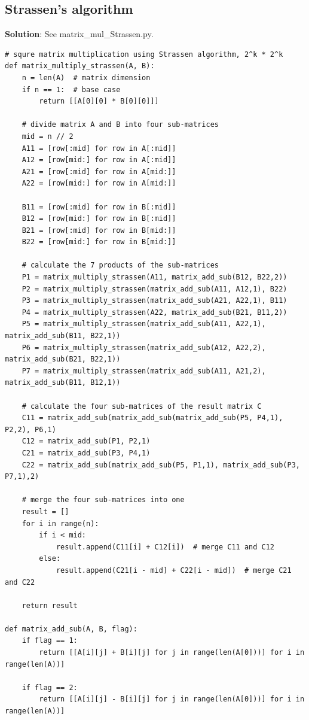 \documentclass[UTF8]{ctexart}
\begin{document}
\subsection{Strassen's algorithm}
\textbf{Solution}: See matrix\_mul\_Strassen.py.
\begin{lstlisting}
# squre matrix multiplication using Strassen algorithm, 2^k * 2^k
def matrix_multiply_strassen(A, B):
    n = len(A)  # matrix dimension
    if n == 1:  # base case
        return [[A[0][0] * B[0][0]]]
    
    # divide matrix A and B into four sub-matrices
    mid = n // 2
    A11 = [row[:mid] for row in A[:mid]]
    A12 = [row[mid:] for row in A[:mid]]
    A21 = [row[:mid] for row in A[mid:]]
    A22 = [row[mid:] for row in A[mid:]]
    
    B11 = [row[:mid] for row in B[:mid]]
    B12 = [row[mid:] for row in B[:mid]]
    B21 = [row[:mid] for row in B[mid:]]
    B22 = [row[mid:] for row in B[mid:]]
    
    # calculate the 7 products of the sub-matrices
    P1 = matrix_multiply_strassen(A11, matrix_add_sub(B12, B22,2))
    P2 = matrix_multiply_strassen(matrix_add_sub(A11, A12,1), B22)
    P3 = matrix_multiply_strassen(matrix_add_sub(A21, A22,1), B11)
    P4 = matrix_multiply_strassen(A22, matrix_add_sub(B21, B11,2))
    P5 = matrix_multiply_strassen(matrix_add_sub(A11, A22,1), matrix_add_sub(B11, B22,1))
    P6 = matrix_multiply_strassen(matrix_add_sub(A12, A22,2), matrix_add_sub(B21, B22,1))
    P7 = matrix_multiply_strassen(matrix_add_sub(A11, A21,2), matrix_add_sub(B11, B12,1))
    
    # calculate the four sub-matrices of the result matrix C
    C11 = matrix_add_sub(matrix_add_sub(matrix_add_sub(P5, P4,1), P2,2), P6,1)
    C12 = matrix_add_sub(P1, P2,1)
    C21 = matrix_add_sub(P3, P4,1)
    C22 = matrix_add_sub(matrix_add_sub(P5, P1,1), matrix_add_sub(P3, P7,1),2)
    
    # merge the four sub-matrices into one
    result = []
    for i in range(n):
        if i < mid:
            result.append(C11[i] + C12[i])  # merge C11 and C12
        else:
            result.append(C21[i - mid] + C22[i - mid])  # merge C21 and C22
    
    return result

def matrix_add_sub(A, B, flag):
    if flag == 1:
        return [[A[i][j] + B[i][j] for j in range(len(A[0]))] for i in range(len(A))]

    if flag == 2:
        return [[A[i][j] - B[i][j] for j in range(len(A[0]))] for i in range(len(A))]
\end{lstlisting}
\end{document}
